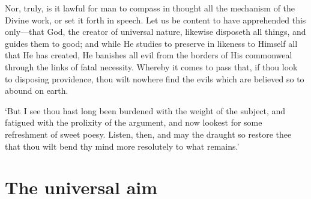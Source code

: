 \documentclass[11pt]{book}
\begin{document}
Nor, truly, is it lawful for man to compass in thought all the mechanism
of the Divine work, or set it forth in speech. Let us be content to
have apprehended this only---that God, the creator of universal nature,
likewise disposeth all things, and guides them to good; and while He
studies to preserve in likeness to Himself all that He has created, He
banishes all evil from the borders of His commonweal through the links
of fatal necessity. Whereby it comes to pass that, if thou look to
disposing providence, thou wilt nowhere find the evils which are
believed so to abound on earth.

`But I see thou hast long been burdened with the weight of the subject,
and fatigued with the prolixity of the argument, and now lookest for
some refreshment of sweet poesy. Listen, then, and may the draught so
restore thee that thou wilt bend thy mind more resolutely to what
remains.'




\section{The universal aim}
\end{document}

